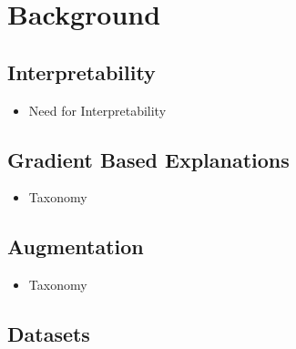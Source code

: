 \chapter{Background}
\section{Interpretability}
\begin{itemize}
\item Need for Interpretability
\end{itemize}
\section{Gradient Based Explanations}
\begin{itemize}
\item Taxonomy
\end{itemize}
\section{Augmentation}
\begin{itemize}
\item Taxonomy
\end{itemize}
\section{Datasets}
\cite{adadiPeekingBlackBoxSurvey2018}